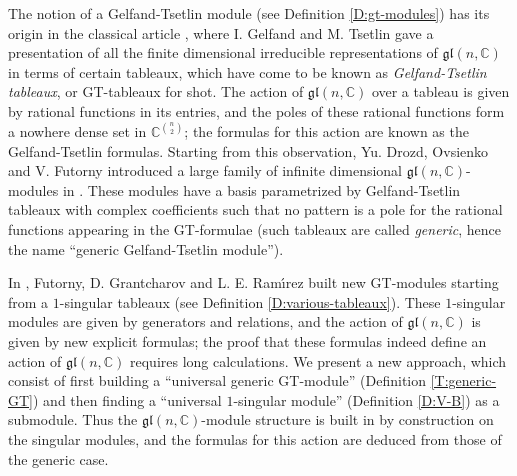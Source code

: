 \documentclass[11pt,fleqn]{article}
\newcommand\CC{\mathbb C}
\newcommand\gl{\mathfrak{gl}}
\begin{document}
The notion of a Gelfand-Tsetlin module (see Definition \ref{D:gt-modules}) has 
its origin in the classical article \cite{GT-modules}, where I. Gelfand and M. 
Tsetlin gave a presentation of all the finite dimensional irreducible 
representations of $\gl(n,\CC)$ in terms of certain tableaux, which have come 
to be known as \emph{Gelfand-Tsetlin tableaux}, or GT-tableaux for shot. The 
action of $\gl(n,\CC)$ over a tableau is given by rational functions in its
entries, and the poles of these rational functions form a nowhere dense set
in $\CC^{\binom{n}{2}}$; the formulas for this action are known as the 
Gelfand-Tsetlin formulas. Starting from this observation, Yu. Drozd, Ovsienko 
and V. Futorny introduced a large family of infinite dimensional 
$\gl(n,\CC)$-modules in \cite{DFO-GT-modules}. These modules have a basis 
parametrized by Gelfand-Tsetlin tableaux with complex coefficients such that 
no pattern is a pole for the rational functions appearing in the GT-formulae 
(such tableaux are called \emph{generic}, hence the name ``generic 
Gelfand-Tsetlin module''). 

In \cite{FGR-singular-gt}, Futorny, D. Grantcharov and L. E. Ram\'\i rez built 
new GT-modules starting from a $1$-singular tableaux (see Definition 
\ref{D:various-tableaux}). These $1$-singular modules are given by generators
and relations, and the action of $\gl(n,\CC)$ is given by new explicit 
formulas; the proof that these formulas indeed define an action of $\gl(n,\CC)$
requires long calculations. We present a new approach, which consist of first
building a ``universal generic GT-module'' (Definition \ref{T:generic-GT})
and then finding a ``universal $1$-singular module'' (Definition \ref{D:V-B})
as a submodule. Thus the $\gl(n,\CC)$-module structure is built in by 
construction on the singular modules, and the formulas for this action are
deduced from those of the generic case. 
\end{document}
